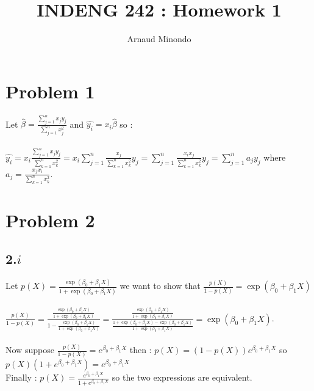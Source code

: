 \documentclass{article}
\title{INDENG 242 : Homework 1}
\author{Arnaud Minondo}
\begin{document}
    \maketitle
    \section*{Problem 1}
    Let $\hat{\beta} = \frac{\sum_{j=1}^n x_jy_j}{\sum_{j=1}^nx_j^2}$ and $ \hat{y_i} = x_i\hat{\beta}$ so :
    \\\\
    $\hat{y_i} = x_i\frac{\sum_{j=1}^n x_jy_j}{\sum_{k=1}^nx_k^2} = x_i \sum_{j=1}^n\frac{x_j}{\sum_{k=1}^nx_k^2}y_j = \sum_{j=1}^n\frac{x_ix_j}{\sum_{k=1}^nx_k^2}y_j =\sum_{j=1}^na_jy_j $
    where $a_j = \frac{x_jx_i}{\sum_{k=1}^nx_k^2}$.
    \\
    \section*{Problem 2}
    \subsection*{2.$i$}
    Let $p(X) = \frac{\exp(\beta_0+\beta_1X)}{1+\exp(\beta_0+\beta_1X)}$ we want to show that $\frac{p(X)}{1-p(X)} = \exp(\beta_0+\beta_1X)$
    \\\\
    ${ \frac{p(X)}{1-p(X)} = \frac{\frac{\exp(\beta_0+\beta_1X)}{1+\exp(\beta_0+\beta_1X)}}{1-\frac{\exp(\beta_0+\beta_1X)}{1+\exp(\beta_0+\beta_1X)}} = \frac{\frac{\exp(\beta_0+\beta_1X)}{1+\exp(\beta_0+\beta_1X)}}{\frac{1+\exp(\beta_0+\beta_1X)-\exp(\beta_0+\beta_1X)}{1+\exp(\beta_0+\beta_1X)}}=\exp(\beta_0+\beta_1X)}$.
    \\\\
    Now suppose $\frac{p(X)}{1-p(X)} = e^{\beta_0+\beta_1X}$ then : $ p(X) = (1-p(X))e^{\beta_0+\beta_1X}$ so $p(X)(1+e^{\beta_0+\beta_1X}) = e^{\beta_0+\beta_1X}$
    \\
    Finally : $p(X) = \frac{e^{\beta_0+\beta_1X}}{1+e^{\beta_0+\beta_1X}}$ so the two expressions are equivalent.
\end{document}

